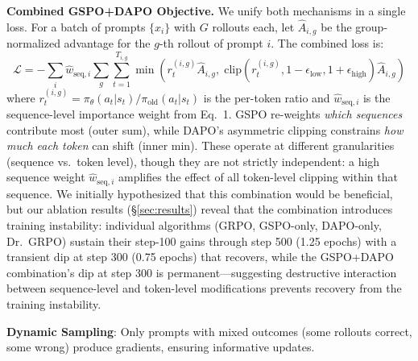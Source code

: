 \documentclass{article}
\begin{document}
\textbf{Combined GSPO+DAPO Objective.} We unify both mechanisms in a single loss. For a batch of prompts $\{x_i\}$ with $G$ rollouts each, let $\hat{A}_{i,g}$ be the group-normalized advantage for the $g$-th rollout of prompt $i$. The combined loss is:
\begin{equation}
    \mathcal{L} = -\sum_{i} \hat{w}_{\text{seq},i} \sum_{g} \sum_{t=1}^{T_{i,g}} \min\!\left(r_t^{(i,g)} \hat{A}_{i,g},\; \text{clip}(r_t^{(i,g)}, 1{-}\epsilon_{\text{low}}, 1{+}\epsilon_{\text{high}}) \hat{A}_{i,g}\right)
\label{eq:gspo_dapo}
\end{equation}
where $r_t^{(i,g)} = \pi_\theta(a_t|s_t) / \pi_{\text{old}}(a_t|s_t)$ is the per-token ratio and $\hat{w}_{\text{seq},i}$ is the sequence-level importance weight from Eq.~1. GSPO re-weights \emph{which sequences} contribute most (outer sum), while DAPO's asymmetric clipping constrains \emph{how much each token} can shift (inner min). These operate at different granularities (sequence vs.\ token level), though they are not strictly independent: a high sequence weight $\hat{w}_{\text{seq},i}$ amplifies the effect of all token-level clipping within that sequence. We initially hypothesized that this combination would be beneficial, but our ablation results (\S\ref{sec:results}) reveal that the combination introduces training instability: individual algorithms (GRPO, GSPO-only, DAPO-only, Dr.~GRPO) sustain their step-100 gains through step 500 (1.25 epochs) with a transient dip at step 300 (0.75 epochs) that recovers, while the GSPO+DAPO combination's dip at step 300 is permanent---suggesting destructive interaction between sequence-level and token-level modifications prevents recovery from the training instability.

\textbf{Dynamic Sampling}: Only prompts with mixed outcomes (some rollouts correct, some wrong) produce gradients, ensuring informative updates.
\end{document}
